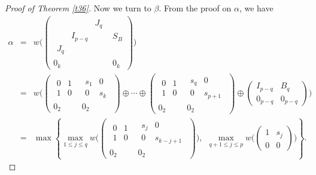 \documentclass[10pt,a4paper]{amsart}
\begin{document}
\begin{proof}[Proof of Theorem \ref{t36}]
Now we turn to $\beta$.
From the proof on $\alpha$, we have
\begin{eqnarray*}
\alpha & = & w\Big(\left(\begin{array}{c|c}\begin{array}{ccc}  & & J_q\\ & I_{p-q} & \\ J_q & & \end{array} & S_B
\\ \hline 0_k & 0_k\end{array}\right)\Big) \\
&= &  w\Big(\left(\begin{array}{c|c}\begin{array}{cc} 0 & 1\\ 1 & 0\end{array} & \begin{array}{cc} s_1 & 0\\ 0 & s_k\end{array}
\\ \hline 0_2 & 0_2\end{array}\right)\oplus \cdots\oplus
\left(\begin{array}{c|c}\begin{array}{cc} 0 & 1\\ 1 & 0\end{array} & \begin{array}{cc} s_q & 0\\ 0 & s_{p+1}\end{array}
\\ \hline 0_2 & 0_2\end{array}\right) \oplus
\begin{pmatrix} I_{p-q} & B_q\\ 0_{p-q} & 0_{p-q}\end{pmatrix}\Big)\\
&=& \max\left\{\max_{1\le j\le q}w\Big(\left(\begin{array}{c|c}\begin{array}{cc} 0 & 1\\ 1 & 0\end{array} & \begin{array}{cc} s_j & 0\\ 0 & s_{k-j+1}\end{array}
\\ \hline 0_2 & 0_2\end{array}\right)\Big), \ \ \max_{q+1\le j\le p} w\Big(\begin{pmatrix} 1 & s_{j}\\ 0 & 0\end{pmatrix}\Big)\right\}.

\end{eqnarray*}
\end{proof}
\end{document}
